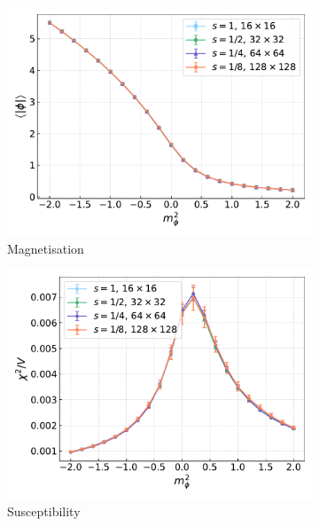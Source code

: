 \begin{figure}[hbp]
    \centering
    \begin{subfigure}[b]{0.48\textwidth}
        \includegraphics[width=1.05\textwidth]{figures/cooling/mass_scan/magnetisation.pdf}
        \caption{Magnetisation}
    \end{subfigure}
    \hfill
    \begin{subfigure}[b]{0.48\textwidth}
        \includegraphics[width=1.05\textwidth]{figures/cooling/mass_scan/susceptibility.pdf}
        \caption{Susceptibility}
    \end{subfigure}
    \begin{subfigure}[b]{0.48\textwidth}

\end{subfigure}
\end{figure}
